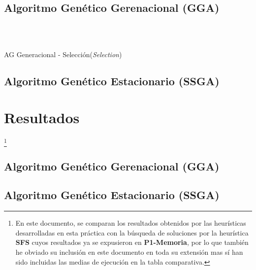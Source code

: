 \documentclass[a4paper, 11pt]{article}
\begin{document}
		\subsection{Algoritmo Genético Gerenacional (\textbf{GGA})}
			
			
			
			\begin{algorithm}[H]
				\begin{algorithmic}[1]
				\REQUIRE \ \\
						 \
						
					\ENDIF
				\ENDWHILE
				
				\end{algorithmic}
			\caption{AG Generacional - Selección(\textit{Selection})}
			\label{GGA-Selec}
			\end{algorithm}
			
		\subsection{Algoritmo Genético Estacionario (\textbf{SSGA})}
			
		
	\section{Resultados}\footnote{En este documento, se comparan los resultados obtenidos por las
	heurísticas desarrolladas en esta práctica con la búsqueda de soluciones por la heurística
	\textbf{SFS} cuyos resultados ya se expusieron en \textbf{P1-Memoria}, por lo que también he
	obviado su inclusión en este documento en toda su extensión mas sí han sido incluidas las medias
	de ejecución en la tabla comparativa.}
		\subsection{Algoritmo Genético Gerenacional (\textbf{GGA})}
			
			
			
		\subsection{Algoritmo Genético Estacionario (\textbf{SSGA})}
			
			
			
			
\end{document}
